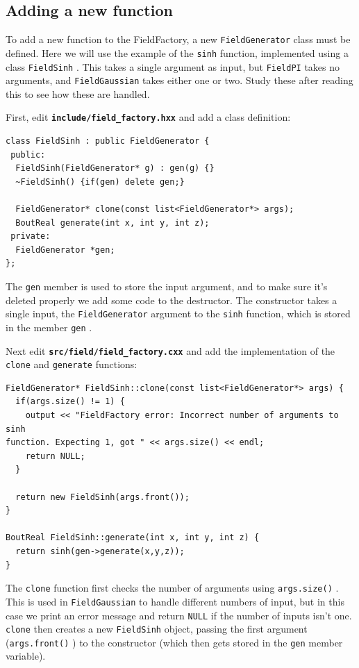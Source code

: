 \documentclass[12pt]{article}
\newcommand{\file}[1]{\texttt{\bf #1}}
\begin{document}
\subsection{Adding a new function}
%
To add a new function to the FieldFactory, a new
%
\lstinline!FieldGenerator!
%
 class must be defined. Here we will use the example of the
%
\lstinline!sinh!
%
 function, implemented using a class
%
\lstinline!FieldSinh!
%
. This takes a single argument as input, but
%
\lstinline!FieldPI! takes no arguments, and \lstinline!FieldGaussian!
%
 takes either one or two.  Study these after reading this to see how these are
 handled.

First, edit \file{include/field\_factory.hxx} and add a class definition:
%
\begin{lstlisting}[firstnumber=122]
class FieldSinh : public FieldGenerator {
 public:
  FieldSinh(FieldGenerator* g) : gen(g) {}
  ~FieldSinh() {if(gen) delete gen;}

  FieldGenerator* clone(const list<FieldGenerator*> args);
  BoutReal generate(int x, int y, int z);
 private:
  FieldGenerator *gen;
};
\end{lstlisting}
%
The
%
\lstinline!gen!
%
 member is used to store the input argument, and to make sure it's deleted
 properly we add some code to the destructor. The constructor takes a single
 input, the
%
\lstinline!FieldGenerator! argument to the \lstinline!sinh! function, which is
stored in the member \lstinline!gen!
%
.

Next edit \file{src/field/field\_factory.cxx} and add the implementation of the
%
\lstinline!clone!
%
 and
%
\lstinline!generate!
%
 functions:
%
\begin{lstlisting}[firstnumber=100]
FieldGenerator* FieldSinh::clone(const list<FieldGenerator*> args) {
  if(args.size() != 1) {
    output << "FieldFactory error: Incorrect number of arguments to sinh 
function. Expecting 1, got " << args.size() << endl;
    return NULL;
  }

  return new FieldSinh(args.front());
}

BoutReal FieldSinh::generate(int x, int y, int z) {
  return sinh(gen->generate(x,y,z));
}
\end{lstlisting}
%
The
%
\lstinline!clone! function first checks the number of arguments using
\lstinline!args.size()!
%
. This is used in
%
\lstinline!FieldGaussian!
%
 to handle different numbers of input, but in this case we print an error
 message and return
%
\lstinline!NULL! if the number of inputs isn't one. \lstinline!clone!
%
 then creates a new
%
\lstinline!FieldSinh! object, passing the first argument
(\lstinline!args.front()!
%
) to the constructor (which then gets stored in the
%
\lstinline!gen!
%
 member variable).
\end{document}
